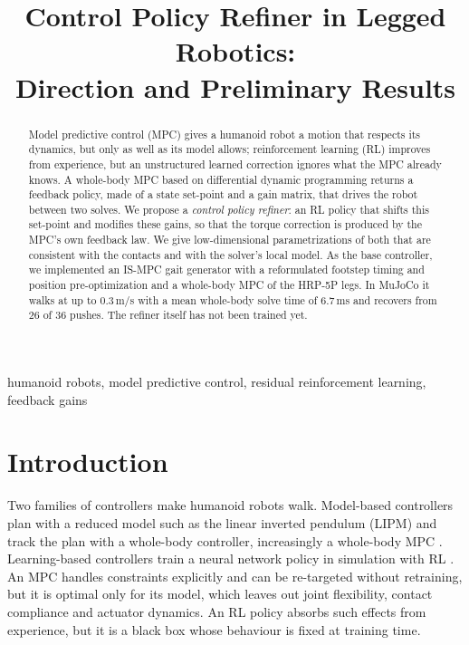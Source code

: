 \documentclass[conference]{IEEEtran}
\begin{document}
\title{Control Policy Refiner in Legged Robotics:\\ Direction and Preliminary Results}

\author{
}

\maketitle

\begin{abstract}
Model predictive control (MPC) gives a humanoid robot a motion that respects its dynamics, but only as well as its model allows; reinforcement learning (RL) improves from experience, but an unstructured learned correction ignores what the MPC already knows.
A whole-body MPC based on differential dynamic programming returns a feedback policy, made of a state set-point and a gain matrix, that drives the robot between two solves.
We propose a \emph{control policy refiner}: an RL policy that shifts this set-point and modifies these gains, so that the torque correction is produced by the MPC's own feedback law.
We give low-dimensional parametrizations of both that are consistent with the contacts and with the solver's local model.
As the base controller, we implemented an IS-MPC gait generator with a reformulated footstep timing and position pre-optimization and a whole-body MPC of the HRP-5P legs.
In MuJoCo it walks at up to 0.3\,m/s with a mean whole-body solve time of 6.7\,ms and recovers from 26 of 36 pushes.
The refiner itself has not been trained yet.
\end{abstract}

\begin{IEEEkeywords}
humanoid robots, model predictive control, residual reinforcement learning, feedback gains
\end{IEEEkeywords}

\section{Introduction}

Two families of controllers make humanoid robots walk.
Model-based controllers plan with a reduced model such as the linear inverted pendulum (LIPM) \cite{kajita2001lipm} and track the plan with a whole-body controller, increasingly a whole-body MPC \cite{mastalli2020crocoddyl,dantec2022wbmpc}.
Learning-based controllers train a neural network policy in simulation with RL \cite{radosavovic2024humanoid}.
An MPC handles constraints explicitly and can be re-targeted without retraining, but it is optimal only for its model, which leaves out joint flexibility, contact compliance and actuator dynamics.
An RL policy absorbs such effects from experience, but it is a black box whose behaviour is fixed at training time.
\end{document}
